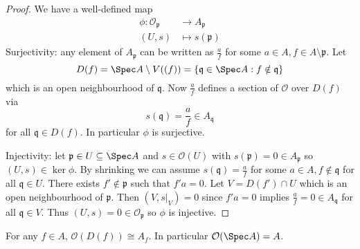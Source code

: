\documentclass[a4paper]{article}
\newcommand{\sh}[1]{\mathcal{#1}} %
\begin{document}
\begin{proof}
  We have a well-defined map
  \begin{align*}
    \phi: \sh O_{\mathfrak p} &\to A_{\mathfrak p} \\
    (U, s) &\mapsto s(\mathfrak p)
  \end{align*}
  Surjectivity: any element of \(A_{\mathfrak p}\) can be written as \(\frac{a}{f}\) for some \(a \in A, f \in A \setminus \mathfrak p\). Let
  \[
    D(f) = \Spec A \setminus V((f)) = \{\mathfrak q \in \Spec A: f \notin \mathfrak q\}
  \]
  which is an open neighbourhood of \(\mathfrak q\). Now \(\frac{a}{f}\) defines a section of \(\sh O\) over \(D(f)\) via
  \[
    s(\mathfrak q) = \frac{a}{f} \in A_{\mathfrak q}
  \]
  for all \(\mathfrak q \in D(f)\). In particular \(\phi\) is surjective.

  Injectivity: let \(\mathfrak p \in U \subseteq \Spec A\) and \(s \in \sh O(U)\) with \(s(\mathfrak p) = 0 \in A_{\mathfrak p}\) so \((U, s) \in \ker \phi\). By shrinking we can assume \(s(\mathfrak q) = \frac{a}{f}\) for some \(a \in A, f \notin \mathfrak q\) for all \(\mathfrak q \in U\). There exists \(f' \notin \mathfrak p\) such that \(f'a = 0\). Let \(V = D(f') \cap U\) which is an open neighbourhood of \(\mathfrak p\). Then \((V, s|_V) = 0\) since \(f'a = 0\) implies \(\frac{a}{f} = 0 \in A_{\mathfrak q}\) for all \(\mathfrak q \in V\). Thus \((U, s) = 0 \in \sh O_{\mathfrak p}\) so \(\phi\) is injective.
\end{proof}

\begin{proposition}
  For any \(f \in A\), \(\sh O(D(f)) \cong A_f\). In particular \(\sh O(\Spec A) = A\).
\end{proposition}
\end{document}
